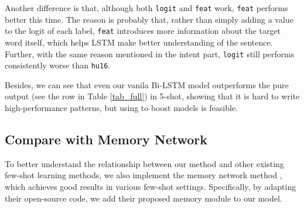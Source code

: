 Another difference is that, although both \texttt{logit} and \texttt{feat} work, \texttt{feat} performs better this time. The reason is probably that, rather than simply adding a value to the logit of each label, \texttt{feat} introduces more information about the target word itself, which helps LSTM make better understanding of the sentence. Further, with the same reason mentioned in the intent part, \texttt{logit} still performs consistently worse than \texttt{hu16}.


Besides, we can see that even our vanila Bi-LSTM model outperforms the pure \RE output (see the \RE row in Table \ref{tab_full}) in 5-shot, showing that it is hard to write high-performance \RE patterns, but using \RE to boost \NN models is feasible. 


\subsection{Compare with Memory Network}
To better understand the relationship between our method and other existing few-shot learning methods, we also implement the memory network method \cite{kaiser2017learning}, which achieves good results in various few-shot settings. Specifically, by adapting their open-source code, we add their proposed memory module to our \BLSTM model.

